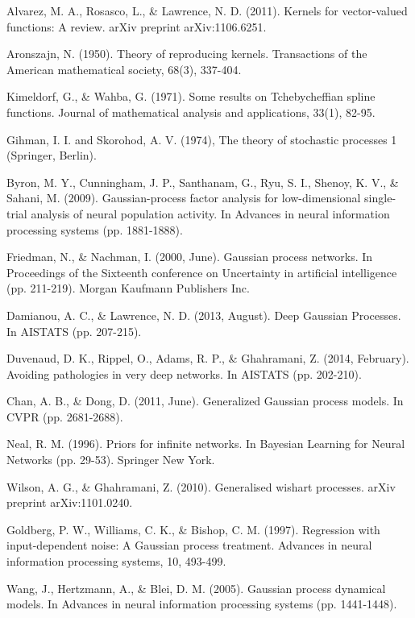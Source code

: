\begin{thebibliography}{99}
 Alvarez, M. A., Rosasco, L., \& Lawrence, N. D. (2011). Kernels
for vector-valued functions: A review. arXiv preprint arXiv:1106.6251.

 Aronszajn, N. (1950). Theory of reproducing kernels.
Transactions of the American mathematical society, 68(3), 337-404.

 Kimeldorf, G., \& Wahba, G. (1971). Some results on
Tchebycheffian spline functions. Journal of mathematical analysis and
applications, 33(1), 82-95.

 Gihman, I. I. and Skorohod, A. V. (1974), The theory of
stochastic processes 1 (Springer, Berlin).

 Byron, M. Y., Cunningham, J. P., Santhanam, G., Ryu, S. I.,
Shenoy, K. V., \& Sahani, M. (2009). Gaussian-process factor analysis for
low-dimensional single-trial analysis of neural population activity. In
Advances in neural information processing systems (pp. 1881-1888).

 Friedman, N., \& Nachman, I. (2000, June). Gaussian process
networks. In Proceedings of the Sixteenth conference on Uncertainty in
artificial intelligence (pp. 211-219). Morgan Kaufmann Publishers Inc.

 Damianou, A. C., \& Lawrence, N. D. (2013, August). Deep
Gaussian Processes. In AISTATS (pp. 207-215).

 Duvenaud, D. K., Rippel, O., Adams, R. P., \& Ghahramani, Z.
(2014, February). Avoiding pathologies in very deep networks. In AISTATS
(pp. 202-210).

 Chan, A. B., \& Dong, D. (2011, June). Generalized Gaussian
process models. In CVPR (pp. 2681-2688).

 Neal, R. M. (1996). Priors for infinite networks. In Bayesian
Learning for Neural Networks (pp. 29-53). Springer New York.

 Wilson, A. G., \& Ghahramani, Z. (2010). Generalised wishart
processes. arXiv preprint arXiv:1101.0240.

 Goldberg, P. W., Williams, C. K., \& Bishop, C. M. (1997).
Regression with input-dependent noise: A Gaussian process treatment.
Advances in neural information processing systems, 10, 493-499.

 Wang, J., Hertzmann, A., \& Blei, D. M. (2005). Gaussian
process dynamical models. In Advances in neural information processing
systems (pp. 1441-1448).


\end{thebibliography}
